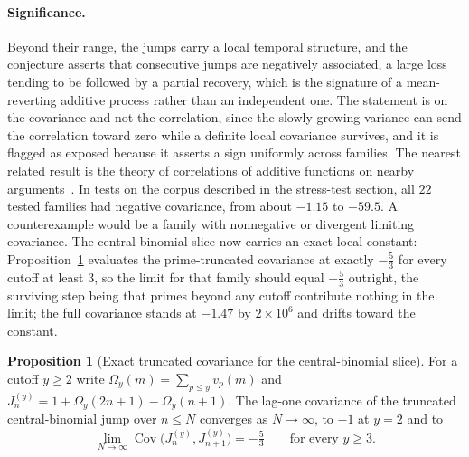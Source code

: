 \documentclass[11pt]{article}
\theoremstyle{definition}
\newtheorem{proposition}{Proposition}
\begin{document}
\paragraph{Significance.}
Beyond their range, the jumps carry a local temporal structure, and the conjecture asserts that consecutive jumps are negatively associated, a large loss tending to be followed by a partial recovery, which is the signature of a mean-reverting additive process rather than an independent one.  The statement is on the covariance and not the correlation, since the slowly growing variance can send the correlation toward zero while a definite local covariance survives, and it is flagged as exposed because it asserts a sign uniformly across families.  The nearest related result is the theory of correlations of additive functions on nearby arguments~\cite{Ten}.  In tests on the corpus described in the stress-test section, all $22$ tested families had negative covariance, from about $-1.15$ to $-59.5$.  A counterexample would be a family with nonnegative or divergent limiting covariance.  The central-binomial slice now carries an exact local constant: Proposition~\ref{w:cov53} evaluates the prime-truncated covariance at exactly $-\tfrac53$ for every cutoff at least $3$, so the limit for that family should equal $-\tfrac53$ outright, the surviving step being that primes beyond any cutoff contribute nothing in the limit; the full covariance stands at $-1.47$ by $2\times10^6$ and drifts toward the constant.

\begin{proposition}[Exact truncated covariance for the central-binomial slice]\label{w:cov53}
For a cutoff $y\ge2$ write $\Omega_y(m)=\sum_{p\le y}v_p(m)$ and $J^{(y)}_n=1+\Omega_y(2n+1)-\Omega_y(n+1)$.  The lag-one covariance of the truncated central-binomial jump over $n\le N$ converges as $N\to\infty$, to $-1$ at $y=2$ and to
\[
\lim_{N\to\infty}\operatorname{Cov}\bigl(J^{(y)}_n,J^{(y)}_{n+1}\bigr)=-\tfrac53\qquad\text{for every }y\ge3.
\]
\end{proposition}
\end{document}
